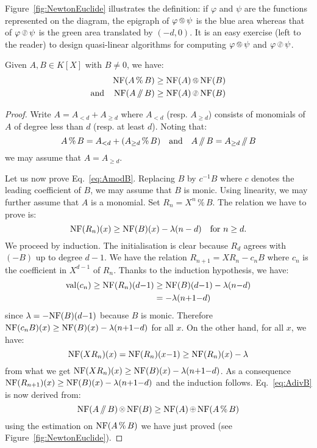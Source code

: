 \documentclass{sig-alternate-2013}
\DeclareMathOperator{\val}{val}
\newcommand{\NF}{\text{\rm NF}}
\renewcommand{\mod}{\,\%\,}
\renewcommand{\div}{\,/\hspace{-0.3em}/\,}
\newcommand{\nfop}[1]{%
\raisebox{-0.1mm}{\begin{tikzpicture}
\draw[transparent] (-0.18,0)--(0.18,0);
\draw[very thin] (0,0) circle (0.11cm);
\begin{scope}
\clip (0,0) circle (0.11cm);
\node[scale=0.75] at (0,0) { $#1$ };
\end{scope}
\end{tikzpicture}}}
\newcommand{\nfplus}{\nfop+}
\newcommand{\nftimes}{\nfop\times}
\newcommand{\nfmod}{\nfop\mod}
\newcommand{\nfdiv}{\nfop\div}
\begin{document}
Figure~\ref{fig:NewtonEuclide} illustrates the definition: if $\varphi$ 
and $\psi$ are the functions represented on the diagram, the epigraph of 
$\varphi \nfmod \psi$ is the blue area whereas that of $\varphi \nfdiv \psi$ 
is the green area translated by $(-d,0)$.
It is an easy exercise (left to the reader) to design quasi-linear
algorithms for computing $\varphi \nfmod \psi$ and $\varphi \nfdiv \psi$.

\begin{theo}
\label{theo:EDivisionNP}
Given $A, B \in K[X]$ with $B \neq 0$, we have:
\begin{align}
\NF(A \mod B) & \geq \NF(A) \nfmod \NF(B) \label{eq:AmodB} \\
\text{and} \hspace{4mm}
\NF(A \div B) & \geq \NF(A) \nfdiv \NF(B) \label{eq:AdivB}
\end{align}
\end{theo}

\begin{proof}
Write $A = A_{<d} + A_{\geq d}$ where $A_{<d}$ (resp. $A_{\geq d}$)
consists of monomials of $A$ of degree less than $d$ (resp. at least
$d$). Noting that:
$$A \mod B = A_{<d} + (A_{\geq d} \mod B)
\quad \text{and} \quad
A \div B = A_{\geq d} \div B$$
we may assume that $A = A_{\geq d}$.

Let us now prove Eq.~\eqref{eq:AmodB}. 
Replacing $B$ by $c^{-1} B$ where $c$ denotes the leading coefficient
of $B$, we may assume that $B$ is monic. Using linearity, we may further
assume that $A$ is a monomial. Set $R_n = X^n \mod B$. The relation
we have to prove is:
$$\NF(R_n)(x) \geq \NF(B)(x) - \lambda(n-d)
\quad \text{for } n\geq d.$$
We proceed by induction. The initialisation is clear because $R_d$
agrees with $(-B)$ up to degree $d{-}1$. We have the relation
$R_{n+1} = X R_n - c_n B$
where $c_n$ is the coefficient in $X^{d-1}$ of $R_n$. Thanks to the
induction hypothesis, we have:
\begin{align*}
\val(c_n) \geq \NF(R_n)(d{-}1) & \geq \NF(B)(d{-}1) - \lambda(n{-}d) \\
& = - \lambda(n{+}1{-}d)
\end{align*}
since $\lambda = -\NF(B)(d{-}1)$ because $B$ is monic. Therefore
$\NF(c_n B)(x) \geq \NF(B)(x) - \lambda(n{+}1{-}d)$ for all $x$. On the 
other hand, for all $x$, we have:
$$\NF(X R_n)(x) = \NF(R_n)(x{-}1) \geq \NF(R_n)(x) - \lambda$$
from what we get $\NF(X R_n)(x) \geq \NF(B)(x) - \lambda(n{+}1{-}d)$. As a
consequence
$\NF(R_{n+1})(x) \geq \NF(B)(x) - \lambda(n{+}1{-}d)$
and the induction follows.
Eq.~\eqref{eq:AdivB} is now derived from:
$$\NF(A \div B) \nftimes \NF(B) \geq \NF(A) \nfplus \NF(A \mod B)$$
using the estimation on $\NF(A\mod B)$ we have just proved
(see Figure~\ref{fig:NewtonEuclide}).
\end{proof}
\end{document}
